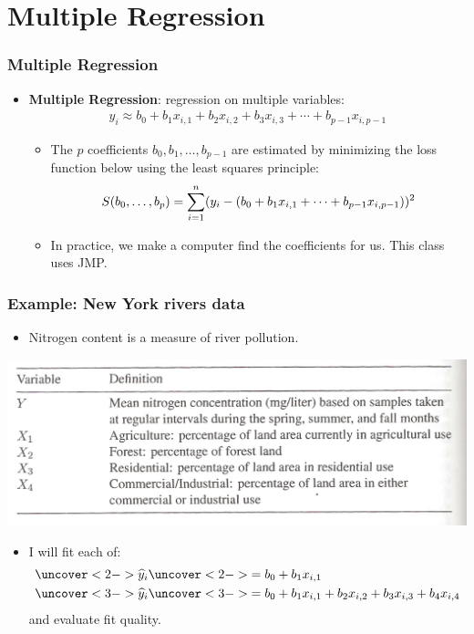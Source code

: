 \documentclass[handout]{beamer}
\providecommand{\wh}[1]{\widehat{#1}}
\numberwithin{equation}{section}
\begin{document}
\section{Multiple Regression}

\begin{frame}
\frametitle{Multiple Regression}
\begin{itemize}
\pause \item {\bf Multiple Regression}: regression on multiple variables:
\pause \begin{align*}
y_i \approx b_0 + b_1 x_{i, 1} + b_2 x_{i, 2} + b_3 x_{i,3} + \cdots + b_{p-1} x_{i, {p-1}}
\end{align*}
\begin{itemize}
\pause \item The $p$ coefficients $b_0, b_1, \ldots, b_{p-1}$ are estimated by minimizing the loss function below using the least squares principle:
\pause \begin{align*} \scriptsize
S(b_0, \ldots, b_p) = \sum_{i = 1}^n (y_i -  (b_0 + b_1 x_{i, 1} + \cdots + b_{p-1} x_{i,p-1}))^2
\end{align*}
\pause \item In practice, we make a computer find the coefficients for us. This class uses JMP.
\end{itemize}
\end{itemize}
\end{frame}


\begin{frame}
\frametitle{Example: New York rivers data}
\begin{itemize}
\item Nitrogen content is a measure of river pollution. 
\end{itemize}
 \includegraphics{../../fig/riversdefs.png}
\begin{itemize}
\pause \item I will fit each of:
\begin{align*}
\uncover<2->{\wh{y}_i} & \uncover<2->{= b_0 + b_1 x_{i, 1}} \\
\uncover<3->{\wh{y}_i }& \uncover<3->{= b_0 + b_1 x_{i, 1} + b_2 x_{i, 2}+ b_3 x_{i, 3}+ b_4 x_{i, 4}}
\end{align*}
\pause \pause and evaluate fit quality.
\end{itemize}
\end{frame}
\end{document}
